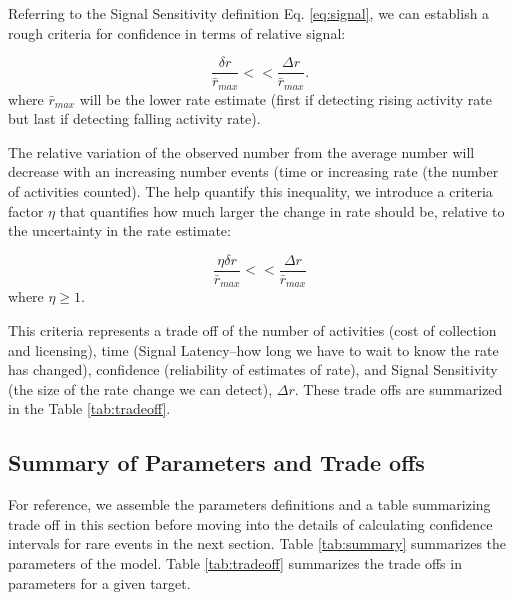 \documentclass{article}
\begin{document}
Referring to the Signal Sensitivity definition Eq. \ref{eq:signal}, we can establish a rough criteria for confidence in terms of relative signal: 

\begin{equation}
    \label{eq:criteria}
    \frac{\delta r}{\bar{r}_{max}} << \frac{\Delta r}{\bar{r}_{max}}.
\end{equation}
where $\bar{r}_{max}$ will be the lower rate estimate (first if detecting rising activity rate but last if detecting falling activity rate).

The relative variation of the observed number from the average number will decrease with an increasing number events (time or increasing rate (the number of activities counted). The help quantify this inequality, we introduce a criteria factor $\eta$ that quantifies how much larger the change in rate should be, relative to the uncertainty in the rate estimate:

\begin{equation}
    \label{eq:criteriaParam}
    \frac{\eta \delta r}{\bar{r}_{max}} << \frac{\Delta r}{\bar{r}_{max}}
\end{equation}
where $\eta \ge 1$.

This criteria represents a trade off of the number of activities (cost of collection and licensing), time (Signal Latency--how long we have to wait to know the rate has changed), confidence (reliability of estimates of rate), and Signal Sensitivity (the size of the rate change we can detect), $\Delta r$. These trade offs are summarized in the Table \ref{tab:tradeoff}.

\subsection{Summary of Parameters and Trade offs}

For reference, we assemble the parameters definitions and a table summarizing trade off in this section before moving into the details of calculating confidence intervals for rare events in the next section.  Table \ref{tab:summary} summarizes the parameters of the model. Table \ref{tab:tradeoff} summarizes the trade offs in parameters for a given target.
\end{document}
